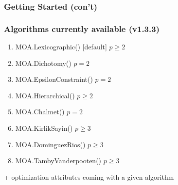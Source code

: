 \documentclass[]{beamer}
\begin{document}
\begin{frame}
  \frametitle{Getting Started (con't)}
\vspace{3mm}

\begin{center}
\end{center}

\end{frame}

% 
%

\begin{frame}
  \frametitle{Algorithms currently available (v1.3.3)}


\begin{enumerate}
\item     MOA.Lexicographic() [default]  \hfill $p \ge 2$
\item     MOA.Dichotomy()   \hfill $p=2$
\item     MOA.EpsilonConstraint() \hfill $p=2$

\medskip

\item     MOA.Hierarchical() \hfill $p \ge 2$
\item     MOA.Chalmet() \hfill $p=2$

\pause
\medskip

\item     MOA.KirlikSayin() \hfill $p \ge 3$
\item     MOA.DominguezRios() \hfill $p \ge 3$
\item     MOA.TambyVanderpooten() \hfill $p \ge 3$
\end{enumerate}
\vspace{6mm}
\pause

\noindent
{+ optimization attributes coming with a given algorithm}

\end{frame}
\end{document}

